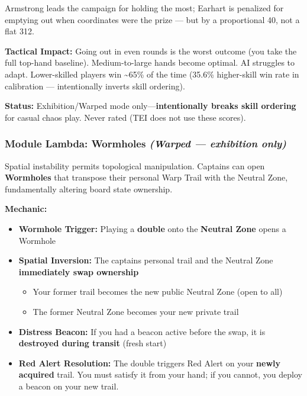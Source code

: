\documentclass[11pt]{article}
\providecommand{\tightlist}{%
  \setlength{\itemsep}{0pt}\setlength{\parskip}{0pt}}
\begin{document}
Armstrong leads the campaign for holding the most; Earhart is penalized
for emptying out when coordinates were the prize --- but by a proportional 40,
not a flat 312.

\textbf{Tactical Impact:} Going out in even rounds is the worst outcome
(you take the full top-hand baseline). Medium-to-large hands become
optimal. AI struggles to adapt. Lower-skilled players win
\textasciitilde65\% of the time (35.6\% higher-skill win rate in
calibration --- intentionally inverts skill ordering).

\textbf{Status:} Exhibition/Warped mode only---\textbf{intentionally
breaks skill ordering} for casual chaos play. Never rated (TEI does not
use these scores).

\subsubsection{\texorpdfstring{Module Lambda: Wormholes
\emph{(Warped --- exhibition
only)}}{Module Lambda: Wormholes (Warped --- exhibition only)}}\label{module-lambda-wormholes-warped--exhibition-only}

Spatial instability permits topological manipulation. Captains can open
\textbf{Wormholes} that transpose their personal Warp Trail with the
Neutral Zone, fundamentally altering board state ownership.

\textbf{Mechanic:}

\begin{itemize}
\tightlist
\item
  \textbf{Wormhole Trigger:} Playing a \textbf{double} onto the
  \textbf{Neutral Zone} opens a Wormhole
\item
  \textbf{Spatial Inversion:} The captain\textquotesingle s personal
  trail and the Neutral Zone \textbf{immediately swap ownership}
  \begin{itemize}
  \tightlist
  \item
    Your former trail becomes the new public Neutral Zone (open to all)
  \item
    The former Neutral Zone becomes your new private trail
  \end{itemize}
\item
  \textbf{Distress Beacon:} If you had a beacon active before the swap,
  it is \textbf{destroyed during transit} (fresh start)
\item
  \textbf{Red Alert Resolution:} The double triggers Red Alert on your
  \textbf{newly acquired} trail. You must satisfy it from your hand; if
  you cannot, you deploy a beacon on your new trail.
\end{itemize}
\end{document}
